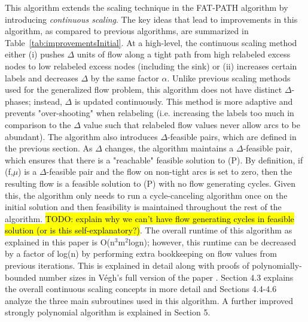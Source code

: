 \documentclass[11pt]{article}
\theoremstyle{definition}
\theoremstyle{definition}
\newcommand{\todo}[1]{\hl{TODO: #1}}
\begin{document}
This algorithm extends the scaling technique in the FAT-PATH algorithm \cite{Goldberg:1991:CAG:105014.105022} by introducing \textit{continuous scaling}. The key ideas that lead to improvements in this algorithm, as compared to previous algorithms, are summarized in Table~\ref{tab:improvementsInitial}. At a high-level, the continuous scaling method either (i) pushes $\Delta$ units of flow along a tight path from high relabeled excess nodes to low relabeled excess nodes (including the sink) or (ii) increases certain labels and decreases $\Delta$ by the same factor $\alpha$. Unlike previous scaling methods used for the generalized flow problem, this algorithm does not have distinct $\Delta$-phases; instead, $\Delta$ is updated continuously. This method is more adaptive and prevents "over-shooting" when relabeling (i.e. increasing the labels too much in comparison to the $\Delta$ value such that relabeled flow values never allow arcs to be abundant). The algorithm also introduces $\Delta$-feasible pairs, which are defined in the previous section. As $\Delta$ changes, the algorithm maintains a $\Delta$-feasible pair, which ensures that there is a "reachable" feasible solution to (P). By definition, if (f,$\mu$) is a $\Delta$-feasible pair and the flow on non-tight arcs is set to zero, then the resulting flow is a feasible solution to (P) with no flow generating cycles. Given this, the algorithm only needs to run a cycle-canceling algorithm once on the initial solution and then feasibility is maintained throughout the rest of the algorithm. \todo{explain why we can't have flow generating cycles in feasible solution (or is this self-explanatory?)}. The overall runtime of this algorithm as explained in this paper is O(n$^3$m$^2$logn); however, this runtime can be decreased by a factor of log(n) by performing extra bookkeeping on flow values from previous iterations. This is explained in detail along with proofs of polynomially-bounded number sizes in Végh's full version of the paper \cite{article}. Section 4.3 explains the overall continuous scaling concepts in more detail and Sections 4.4-4.6 analyze the three main subroutines used in this algorithm. A further improved strongly polynomial algorithm is explained in Section 5. 
\end{document}
